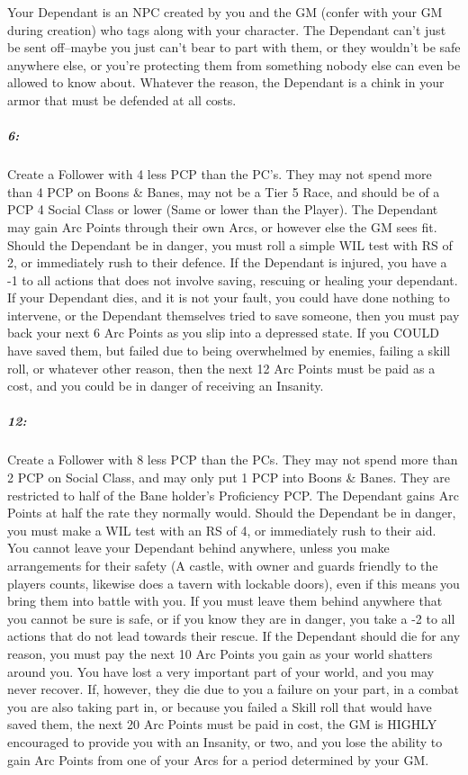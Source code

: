 \documentclass[oneside,11pt,english]{book}
\begin{document}
Your Dependant is an NPC created by you and the GM (confer with your GM during creation) who tags 
along with your character. The Dependant can’t just be sent off--maybe you just can’t bear to part with 
them, or they wouldn’t be safe anywhere else, or you’re protecting them from something nobody else can 
even be allowed to know about. Whatever the reason, the Dependant is a chink in your armor that must be 
defended at all costs. 
\subparagraph{6:} Create a Follower with 4 less PCP than the PC’s. They may not spend more than 4 PCP on Boons \& Banes, may not be a Tier 5 Race, and should be of a PCP 4 Social Class or lower (Same or lower than the Player). The Dependant may gain Arc Points through their own Arcs, or however else the GM sees fit. Should the Dependant be in danger, you must roll a simple WIL test with RS of 2, or immediately rush to their defence. If the Dependant is injured, you have a -1 to all actions that does not involve saving, rescuing or healing your dependant. If your Dependant dies, and it is not your fault, you could have done nothing to intervene, or the Dependant themselves tried to save someone, then you must pay back your next 6 Arc Points as you slip into a depressed state. If you COULD have saved them, but failed due to being overwhelmed by enemies, failing a skill roll, or whatever other reason, then the next 12 Arc Points must be paid as a cost, and you could be in danger of receiving an Insanity.\par

\subparagraph{12:} Create a Follower with 8 less PCP than the PCs. They may not spend more than 2 PCP on Social Class, and may only put 1 PCP into Boons \& Banes. They are restricted to half of the Bane holder’s Proficiency PCP. The Dependant gains Arc Points at half the rate they normally would. Should the Dependant be in danger, you must make a WIL test with an RS of 4, or immediately rush to their aid. You cannot leave your Dependant behind anywhere, unless you make arrangements for their safety (A castle, with owner and guards friendly to the players counts, likewise does a tavern with lockable doors), even if this means you bring them into battle with you. If you must leave them behind anywhere that you cannot be sure is safe, or if you know they are in danger, you take a -2 to all actions that do not lead towards their rescue. If the Dependant should die for any reason, you must pay the next 10 Arc Points you gain as your world shatters around you. You have lost a very important part of your world, and you may never recover. If, however, they die due to you a failure on your part, in a combat you are also taking part in, or because you failed a Skill roll that would have saved them, the next 20 Arc Points must be paid in cost, the GM is HIGHLY encouraged to provide you with an Insanity, or two, and you lose the ability to gain Arc Points from one of your Arcs for a period determined by your GM.\par
\end{document}
